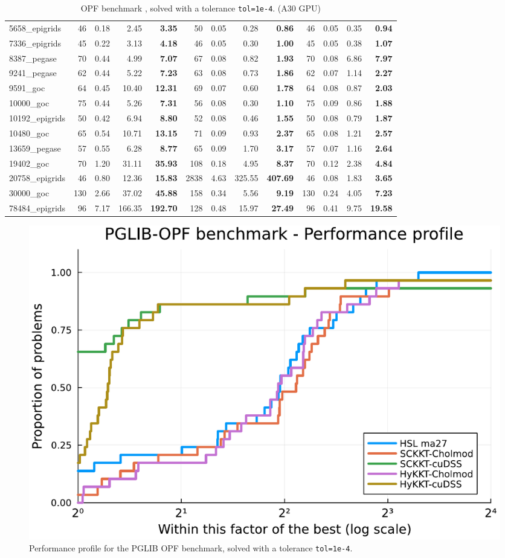 \begin{table}[!ht]
{\begin{tabular}{|l|rrr >{\bfseries}r|rrr >{\bfseries}r|rrr >{\bfseries}r|}
5658\_epigrids & 46 & 0.18 & 2.45 & 3.35 & 50 & 0.05 & 0.28 & 0.86 & 46 & 0.05 & 0.35 & 0.94 \\
7336\_epigrids & 45 & 0.22 & 3.13 & 4.18 & 46 & 0.05 & 0.30 & 1.00 & 45 & 0.05 & 0.38 & 1.07 \\
8387\_pegase & 70 & 0.44 & 4.99 & 7.07 & 67 & 0.08 & 0.82 & 1.93 & 70 & 0.08 & 6.86 & 7.97 \\
9241\_pegase & 62 & 0.44 & 5.22 & 7.23 & 63 & 0.08 & 0.73 & 1.86 & 62 & 0.07 & 1.14 & 2.27 \\
			\hline
9591\_goc & 64 & 0.45 & 10.40 & 12.31 & 69 & 0.07 & 0.60 & 1.78 & 64 & 0.08 & 0.87 & 2.03 \\
10000\_goc & 75 & 0.44 & 5.26 & 7.31 & 56 & 0.08 & 0.30 & 1.10 & 75 & 0.09 & 0.86 & 1.88 \\
10192\_epigrids & 50 & 0.42 & 6.94 & 8.80 & 52 & 0.08 & 0.46 & 1.55 & 50 & 0.08 & 0.79 & 1.87 \\
10480\_goc & 65 & 0.54 & 10.71 & 13.15 & 71 & 0.09 & 0.93 & 2.37 & 65 & 0.08 & 1.21 & 2.57 \\
13659\_pegase & 57 & 0.55 & 6.28 & 8.77 & 65 & 0.09 & 1.70 & 3.17 & 57 & 0.07 & 1.16 & 2.64 \\
			\hline
19402\_goc & 70 & 1.20 & 31.11 & 35.93 & 108 & 0.18 & 4.95 & 8.37 & 70 & 0.12 & 2.38 & 4.84 \\
20758\_epigrids & 46 & 0.80 & 12.36 & 15.83 & 2838 & 4.63 & 325.55 & 407.69 & 46 & 0.08 & 1.83 & 3.65 \\
30000\_goc & 130 & 2.66 & 37.02 & 45.88 & 158 & 0.34 & 5.56 & 9.19 & 130 & 0.24 & 4.05 & 7.23 \\
78484\_epigrids & 96 & 7.17 & 166.35 & 192.70 & 128 & 0.48 & 15.97 & 27.49 & 96 & 0.41 & 9.75 & 19.58 \\
			\hline
		\end{tabular}
  }
  \caption{OPF benchmark \label{tab:opf:benchmark}, solved with a tolerance {\tt tol=1e-4}. (A30 GPU)}
\end{table}

\begin{figure}[!ht]
  \centering
  \includegraphics[width=.6\textwidth]{../figures/pprof.pdf}
  \caption{Performance profile for the PGLIB OPF benchmark, solved
    with a tolerance {\tt tol=1e-4}.
  \label{fig:opf:pprof}}
\end{figure}


